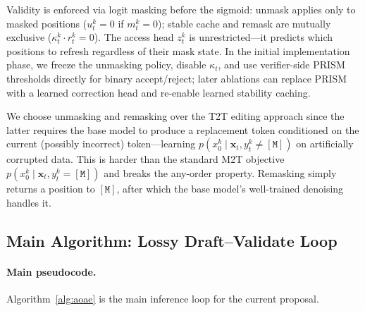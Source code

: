 \documentclass[11pt]{article}
\newcommand{\bx}{\mathbf{x}}
\newcommand{\mask}{\ensuremath{\mathtt{[M]}}}
\begin{document}
Validity is enforced via logit masking before the sigmoid:
unmask applies only to masked positions ($u_t^k = 0$ if $m_t^k = 0$);
stable cache and remask are mutually exclusive ($\kappa_t^k \cdot r_t^k = 0$).
The access head $z_t^k$ is unrestricted---it predicts which positions to refresh regardless of their mask state.
In the initial implementation phase, we freeze the unmasking policy, disable $\kappa_t$, and use verifier-side PRISM thresholds directly for binary accept/reject; later ablations can replace PRISM with a learned correction head and re-enable learned stability caching.

We choose unmasking and remasking over the T2T editing approach since the latter requires the base model to produce a replacement token conditioned on the current (possibly incorrect) token---learning $p(x_0^k \mid \bx_t, y_t^k \neq \mask)$ on artificially corrupted data.
This is harder than the standard M2T objective $p(x_0^k \mid \bx_t, y_t^k = \mask)$ and breaks the any-order property.
Remasking simply returns a position to $\mask$, after which the base model's well-trained denoising handles it.

\subsection{Main Algorithm: Lossy Draft--Validate Loop}
\label{sec:transition}

\paragraph{Main pseudocode.}
Algorithm~\ref{alg:aoae} is the main inference loop for the current proposal.
\end{document}
